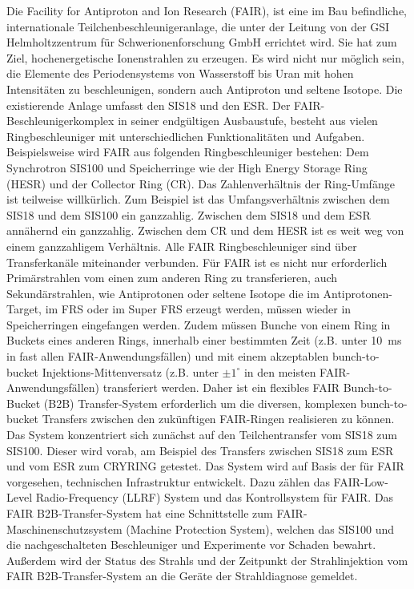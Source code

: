 Die Facility for Antiproton and Ion Research (FAIR), ist eine im Bau befindliche, internationale Teilchenbeschleunigeranlage, die unter der Leitung von der GSI Helmholtzzentrum f\"ur Schwerionenforschung GmbH errichtet wird. Sie hat zum Ziel, hochenergetische
Ionenstrahlen zu erzeugen. Es wird nicht nur m\"oglich sein, die Elemente des Periodensystems von Wasserstoff bis Uran mit hohen Intensit\"aten zu beschleunigen, sondern auch Antiproton und seltene Isotope. Die existierende Anlage umfasst den SIS18 und den ESR. Der FAIR-Beschleunigerkomplex in seiner endg\"ultigen Ausbaustufe, besteht aus vielen Ringbeschleuniger mit unterschiedlichen Funktionalit\"aten und Aufgaben. Beispielsweise wird FAIR aus folgenden Ringbeschleuniger bestehen: Dem Synchrotron SIS100 und Speicherringe wie der High Energy Storage Ring (HESR) und der Collector Ring (CR). Das Zahlenverh\"altnis der Ring-Umf\"ange ist teilweise willk\"urlich. Zum Beispiel ist das Umfangsverh\"altnis zwischen dem SIS18 und dem SIS100 ein ganzzahlig. Zwischen dem SIS18 und dem ESR ann\"ahernd ein ganzzahlig. Zwischen dem CR und dem HESR ist es weit weg von einem ganzzahligem Verh\"altnis. Alle FAIR Ringbeschleuniger sind \"uber Transferkan\"ale miteinander verbunden. F\"ur FAIR ist es nicht nur erforderlich Prim\"arstrahlen vom einen zum anderen Ring zu transferieren, auch Sekund\"arstrahlen, wie Antiprotonen oder seltene Isotope die im Antiprotonen-Target, im FRS oder im Super FRS erzeugt werden, m\"ussen wieder in Speicherringen eingefangen werden. Zudem m\"ussen Bunche von einem Ring in Buckets eines anderen Rings, innerhalb einer bestimmten Zeit (z.B. unter \SI{10}{\ms} in fast allen FAIR-Anwendungsf\"allen) und mit einem akzeptablen bunch-to-bucket Injektions-Mittenversatz (z.B. unter $\pm1^\circ$ in den meisten FAIR-Anwendungsf\"allen) transferiert werden. Daher ist ein flexibles FAIR Bunch-to-Bucket (B2B) Transfer-System erforderlich um die diversen, komplexen bunch-to-bucket Transfers zwischen den zuk\"unftigen FAIR-Ringen realisieren zu k\"onnen. Das System konzentriert sich zun\"achst auf den Teilchentransfer vom SIS18 zum SIS100. Dieser wird vorab, am Beispiel des Transfers zwischen SIS18 zum ESR und vom ESR zum CRYRING getestet. Das System wird auf Basis der f\"ur FAIR vorgesehen, technischen Infrastruktur entwickelt. Dazu z\"ahlen das FAIR-Low-Level Radio-Frequency (LLRF) System und das Kontrollsystem f\"ur FAIR. Das FAIR B2B-Transfer-System hat eine Schnittstelle zum FAIR-Maschinenschutzsystem (Machine Protection System), welchen das SIS100 und die nachgeschalteten Beschleuniger und Experimente vor Schaden bewahrt. Au\ss{}erdem wird der Status des Strahls und der Zeitpunkt der Strahlinjektion vom FAIR B2B-Transfer-System an die Ger\"ate der Strahldiagnose gemeldet.

